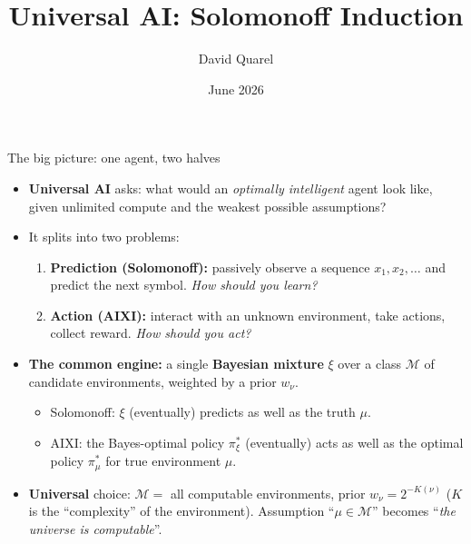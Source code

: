 \documentclass[10pt,aspectratio=169]{beamer}
\newcommand{\cM}{\mathcal{M}}
\begin{document}
\title[Solomonoff: a speedrun]{Universal AI: Solomonoff Induction}
\author[David Quarel]{David Quarel}
\date{June 2026}

\frame{\titlepage}

\begin{frame}{The big picture: one agent, two halves}
\begin{itemize}
    \item \textbf{Universal AI} asks: what would an \emph{optimally intelligent} agent look like, given unlimited compute and the weakest possible assumptions?
    \pause
    \item It splits into two problems:
    \begin{enumerate}
        \item \textbf{Prediction (Solomonoff):} passively observe a sequence $x_1, x_2, \ldots$ and predict the next symbol. \emph{How should you learn?}
        \pause
        \item \textbf{Action (AIXI):} interact with an unknown environment, take actions, collect reward. \emph{How should you act?}
    \end{enumerate}
    \pause
    \item \textbf{The common engine:} a single \textbf{Bayesian mixture} $\xi$ over a class $\cM$ of candidate environments, weighted by a prior $w_\nu$.
    \begin{itemize}
        \item Solomonoff: $\xi$ (eventually) predicts as well as the truth $\mu$.
        \item AIXI: the Bayes-optimal policy $\pi_\xi^*$ (eventually) acts as well as the optimal policy $\pi_\mu^*$ for true environment $\mu$.
    \end{itemize}
    \pause
    \item \textbf{Universal} choice: $\cM=$ all computable environments, prior $w_\nu = 2^{-K(\nu)}$ ($K$ is the ``complexity'' of the environment). Assumption ``$\mu\in\cM$'' becomes ``\emph{the universe is computable}''.
\end{itemize}
\end{frame}

\end{document}
